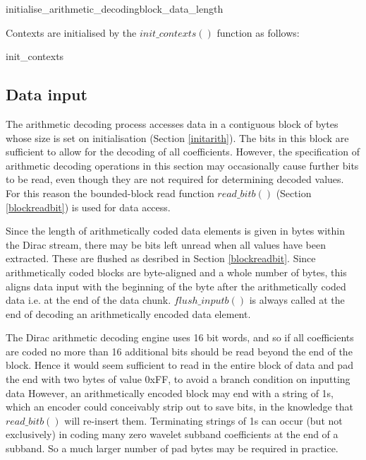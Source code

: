 \begin{pseudo}{initialise\_arithmetic\_decoding}{block\_data\_length}
\bsEND
{}
\end{pseudo}

Contexts are initialised by the $init\_contexts()$ function as follows:

\begin{pseudo}{init\_contexts}{}
\bsEND
\end{pseudo}

\subsection{Data input}
\label{inputarith}

The arithmetic decoding process accesses data in a contiguous block of bytes
whose size is set on initialisation (Section \ref{initarith}). The bits in this
block are sufficient to allow for the
decoding of all coefficients. However, the specification of arithmetic
decoding operations in this section may occasionally cause further bits to be read,
even though they are not required for determining decoded values. For this
reason the bounded-block read function $read\_bitb()$ (Section \ref{blockreadbit}) is 
used for data access.

Since the length of arithmetically coded data elements is given in bytes within the Dirac
stream, there may be bits left unread when all values have been extracted. These
are flushed as desribed in Section \ref{blockreadbit}. Since arithmetically coded blocks
are byte-aligned and a whole number of bytes, this aligns data input with the beginning of the byte 
after the arithmetically coded data i.e. at the end of the
data chunk. $flush\_inputb()$ is always called at the end of decoding an arithmetically encoded
data element.

\begin{informative}
The Dirac arithmetic decoding engine uses 16 bit words, and so if all coefficients are
coded no more than 16 additional bits should be read beyond the end of the block. Hence it 
would seem sufficient to read in the entire block of data and pad the end with two bytes of value 0xFF,
to avoid a branch condition on inputting data
However, an arithmetically encoded block may end with a string of 1s, which an encoder could
conceivably strip out to save bits, in the knowledge that $read\_bitb()$ will re-insert them. Terminating
strings of 1s can occur (but not exclusively) in coding many zero wavelet subband coefficients at the end
of a subband. So a much larger number of pad bytes may be required in practice.
\end{informative}

